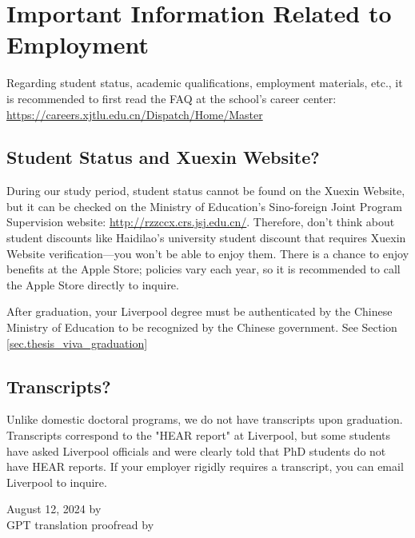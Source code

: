 \section{Important Information Related to Employment}

Regarding student status, academic qualifications, employment materials, etc., it is recommended to first read the FAQ at the school's career center: \url{https://careers.xjtlu.edu.cn/Dispatch/Home/Master}

\subsection{Student Status and Xuexin Website?}

During our study period, student status cannot be found on the Xuexin Website, but it can be checked on the Ministry of Education's Sino-foreign Joint Program Supervision website: \url{http://rzzccx.crs.jsj.edu.cn/}. Therefore, don't think about student discounts like Haidilao's university student discount that requires Xuexin Website verification—you won't be able to enjoy them. There is a chance to enjoy benefits at the Apple Store; policies vary each year, so it is recommended to call the Apple Store directly to inquire.

After graduation, your Liverpool degree must be authenticated by the Chinese Ministry of Education to be recognized by the Chinese government. See Section \ref{sec.thesis_viva_graduation}

\subsection{Transcripts?}

Unlike domestic doctoral programs, we do not have transcripts upon graduation. Transcripts correspond to the "HEAR report" at Liverpool, but some students have asked Liverpool officials and were clearly told that PhD students do not have HEAR reports. If your employer rigidly requires a transcript, you can email Liverpool to inquire.

\begin{flushright}
    August 12, 2024 by \Wu \\
    GPT translation proofread by \Shiyao
\end{flushright}




